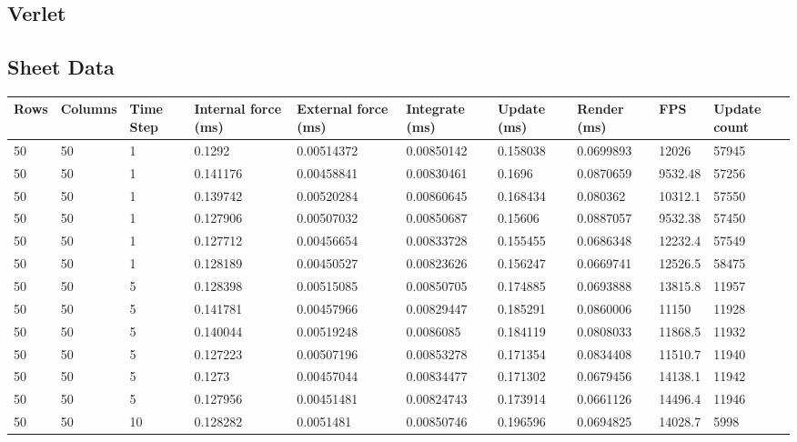 \begin{landscape}
\section{Verlet}

\subsection{Sheet Data}

\begin{longtable}{ | l | l | l | l | l | l | l | l | l | l | }
\hline
 Rows &  Columns &  Time Step &  Internal force (ms) &  External force (ms) &  Integrate (ms) &  Update (ms) &  Render (ms) &  FPS &  Update count \\ \hline
50 & 50 & 1 & 0.1292 & 0.00514372 & 0.00850142 & 0.158038 & 0.0699893 & 12026 & 57945\\ \hline
50 & 50 & 1 & 0.141176 & 0.00458841 & 0.00830461 & 0.1696 & 0.0870659 & 9532.48 & 57256\\ \hline
50 & 50 & 1 & 0.139742 & 0.00520284 & 0.00860645 & 0.168434 & 0.080362 & 10312.1 & 57550\\ \hline
50 & 50 & 1 & 0.127906 & 0.00507032 & 0.00850687 & 0.15606 & 0.0887057 & 9532.38 & 57450\\ \hline
50 & 50 & 1 & 0.127712 & 0.00456654 & 0.00833728 & 0.155455 & 0.0686348 & 12232.4 & 57549\\ \hline
50 & 50 & 1 & 0.128189 & 0.00450527 & 0.00823626 & 0.156247 & 0.0669741 & 12526.5 & 58475\\ \hline
50 & 50 & 5 & 0.128398 & 0.00515085 & 0.00850705 & 0.174885 & 0.0693888 & 13815.8 & 11957\\ \hline
50 & 50 & 5 & 0.141781 & 0.00457966 & 0.00829447 & 0.185291 & 0.0860006 & 11150 & 11928\\ \hline
50 & 50 & 5 & 0.140044 & 0.00519248 & 0.0086085 & 0.184119 & 0.0808033 & 11868.5 & 11932\\ \hline
50 & 50 & 5 & 0.127223 & 0.00507196 & 0.00853278 & 0.171354 & 0.0834408 & 11510.7 & 11940\\ \hline
50 & 50 & 5 & 0.1273 & 0.00457044 & 0.00834477 & 0.171302 & 0.0679456 & 14138.1 & 11942\\ \hline
50 & 50 & 5 & 0.127956 & 0.00451481 & 0.00824743 & 0.173914 & 0.0661126 & 14496.4 & 11946\\ \hline
50 & 50 & 10 & 0.128282 & 0.0051481 & 0.00850746 & 0.196596 & 0.0694825 & 14028.7 & 5998\\ \hline

\end{longtable}
\end{landscape}
